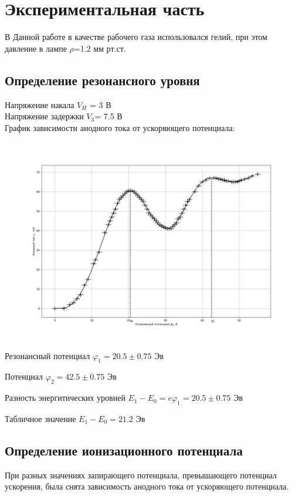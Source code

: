 \newpage
\section{Экспериментальная часть}

В Данной работе в качестве рабочего газа использовался гелий, при этом давление в лампе $\rho$=1.2 мм рт.ст.
\subsection{Определение резонансного уровня}
Напряжение накала $V_H$ = 3 В \\
Напряжение задержки $V_3$= 7.5 В \\
График зависимости анодного тока от ускоряющего потенциала:

\begin{minipage}{\linewidth}
    \centering
    \includegraphics[width=\linewidth]{graphs/1.png}    
\end{minipage}

Резонансный потенциал $\varphi_1=20.5\pm 0.75$ Эв

Потенциал $\varphi_2=42.5 \pm 0.75$ Эв

Разность энергитических уровней $E_1-E_0=e\varphi_1=20.5\pm 0.75$ Эв

Табличное значение $E_1-E_0=21.2$ Эв
\subsection{Определение ионизационного потенциала}
 При разных значениях запирающего потенциала, превышающего потенциал ускорения, была снята зависимость анодного тока от
  ускоряющего потенциала. 

